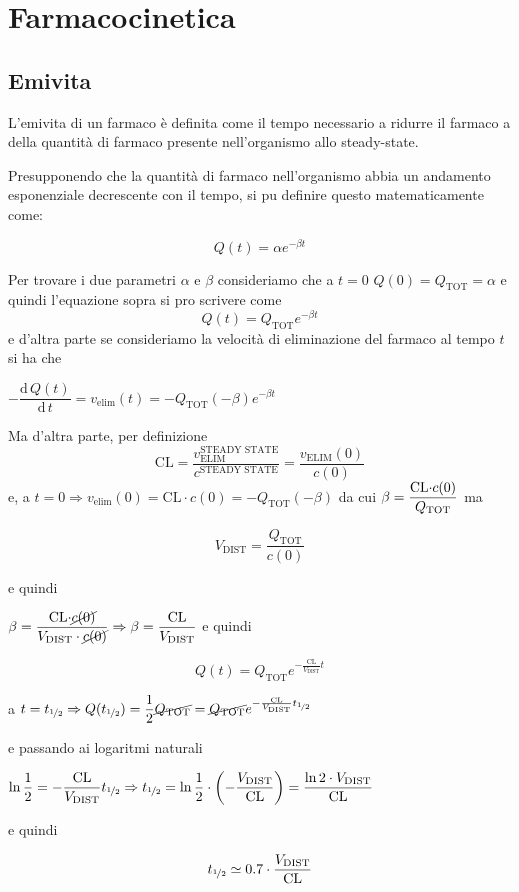 \chapter{Farmacocinetica}

\section{Emivita}

L'emivita di un farmaco è definita come il tempo necessario a ridurre
il farmaco a  della quantità di farmaco presente nell'organismo
allo steady-state.

Presupponendo che la quantità di farmaco nell'organismo abbia un andamento esponenziale decrescente con il tempo, si pu definire questo matematicamente come:

$$
Q(t)=\alpha e^{-\beta t}
$$

Per trovare i due parametri $\alpha$ e $\beta$ consideriamo che a $t=0$
$Q(0)=Q_{\text{TOT}}=\alpha$ e quindi l'equazione sopra si pro scrivere come
$$
Q(t)=Q_{\text{TOT}}e^{-\beta t}
$$
e d'altra parte se consideriamo la velocità di eliminazione del farmaco
al tempo $t$ si ha che\vspace{.5em}

$-\dfrac{\text{d}\,Q(t)}{\text{d}\,t}=v_{\text{elim}}(t)=-Q_{\text{TOT}}(-\beta)e^{-\beta t}$ \vspace{.5em}

Ma d'altra parte, per definizione
$$
\text{CL} = \dfrac{v_\text{ELIM}^\text{STEADY STATE}}{c^\text{STEADY STATE}} =\dfrac{v_\text{ELIM}(0)}{c(0)}
$$
e, a $t=0\Rightarrow v_{\text{elim}}(0)=\text{CL}\cdot c(0)=-Q_{\text{TOT}}(-\beta)$ da cui
$\beta=\dfrac{\text{CL\ensuremath{\cdot}}c(0)}{Q_{\text{TOT}}}$ ma

$$V_\text{DIST} = \dfrac{Q_{\text{TOT}}}{c(0)}$$ 

e quindi \vspace{.5em}

$\beta=\dfrac{\text{CL\ensuremath{\cdot}}\cancel{c(0)}}{V_{\text{DIST}}\cdot\cancel{c(0)}}\Rightarrow\beta=\dfrac{\text{CL}}{V_{\text{DIST}}}$ e quindi

$$
Q(t)=Q_{\text{TOT}}e^{-\frac{\text{CL}}{V_{\text{DIST}}}t}
$$


a $t=t_{\unitfrac{1}{2}}\Rightarrow Q(t_{\unitfrac{1}{2}})=\dfrac{1}{2}\cancel{Q_{\text{TOT}}}=\cancel{Q_{\text{TOT}}}e^{-\frac{\text{CL}}{V_{\text{DIST}}}t_{\unitfrac{1}{2}}}$ 

e passando ai logaritmi naturali

$\ln\dfrac{1}{2}=-\dfrac{\text{CL}}{V_{\text{DIST}}}t_{\unitfrac{1}{2}}\Rightarrow t_{\unitfrac{1}{2}}=\ln\dfrac{1}{2}\cdot\left(-\dfrac{V_{\text{DIST}}}{\text{CL}}\right)=\dfrac{\ln2\cdot V_{\text{DIST}}}{\text{CL}}$

e quindi

\[
t_{\unitfrac{1}{2}}\simeq0.7\cdot\dfrac{V_{\text{DIST}}}{\text{CL}}
\]

